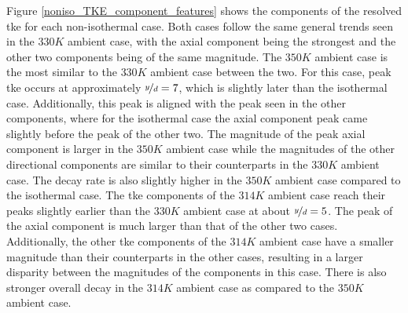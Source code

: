 Figure \ref{noniso_TKE_component_features} shows the components of the resolved \gls{tke} for each non-isothermal case. Both cases follow the same general trends seen in the $330 K$ ambient case, with the axial component being the strongest and the other two components being of the same magnitude. The $350 K$ ambient case is the most similar to the $330 K$ ambient case between the two. For this case, peak \gls{tke} occurs at approximately $\nicefrac{y}{d} = 7$, which is slightly later than the isothermal case. Additionally, this peak is aligned with the peak seen in the other components, where for the isothermal case the axial component peak came slightly before the peak of the other two. The magnitude of the peak axial component is larger in the $350 K$ ambient case while the magnitudes of the other directional components are similar to their counterparts in the $330 K$ ambient case. The decay rate is also slightly higher in the $350 K$ ambient case compared to the isothermal case. The \gls{tke} components of the $314 K$ ambient case reach their peaks slightly earlier than the $330 K$ ambient case at about $\nicefrac{y}{d} = 5$. The peak of the axial component is much larger than that of the other two cases. Additionally, the other \gls{tke} components of the $314 K$ ambient case have a smaller magnitude than their counterparts in the other cases, resulting in a larger disparity between the magnitudes of the components in this case. There is also stronger overall decay in the $314 K$ ambient case as compared to the $350 K$ ambient case.

